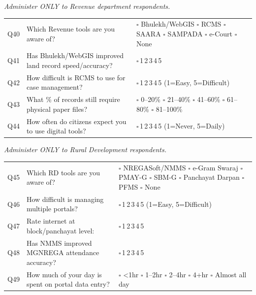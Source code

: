 \documentclass[10pt,a4paper]{article}
\newcommand{\likert}{{\Large$\square$}\,1\quad{\Large$\square$}\,2\quad{\Large$\square$}\,3\quad{\Large$\square$}\,4\quad{\Large$\square$}\,5}
\begin{document}
\small\textit{Administer ONLY to Revenue department respondents.}\vspace{3pt}

\noindent\begin{tabularx}{\textwidth}{@{}L{0.5cm} X L{5.5cm}@{}}
Q40 & Which Revenue tools are you aware of? & {\Large$\square$} Bhulekh/WebGIS {\Large$\square$} RCMS {\Large$\square$} SAARA {\Large$\square$} SAMPADA {\Large$\square$} e-Court {\Large$\square$} None \\[3pt]
Q41 & Has Bhulekh/WebGIS improved land record speed/accuracy? & \likert \\[3pt]
Q42 & How difficult is RCMS to use for case management? & \likert{} {\scriptsize(1=Easy, 5=Difficult)} \\[3pt]
Q43 & What \% of records still require physical paper files? & {\Large$\square$} 0--20\% {\Large$\square$} 21--40\% {\Large$\square$} 41--60\% {\Large$\square$} 61--80\% {\Large$\square$} 81--100\% \\[3pt]
Q44 & How often do citizens expect you to use digital tools? & \likert{} {\scriptsize(1=Never, 5=Daily)} \\
\end{tabularx}

\vspace{3pt}
\vspace{4pt}

\small\textit{Administer ONLY to Rural Development respondents.}\vspace{3pt}

\noindent\begin{tabularx}{\textwidth}{@{}L{0.5cm} X L{5.5cm}@{}}
Q45 & Which RD tools are you aware of? & {\Large$\square$} NREGASoft/NMMS {\Large$\square$} e-Gram Swaraj {\Large$\square$} PMAY-G {\Large$\square$} SBM-G {\Large$\square$} Panchayat Darpan {\Large$\square$} PFMS {\Large$\square$} None \\[3pt]
Q46 & How difficult is managing multiple portals? & \likert{} {\scriptsize(1=Easy, 5=Difficult)} \\[3pt]
Q47 & Rate internet at block/panchayat level: & \likert \\[3pt]
Q48 & Has NMMS improved MGNREGA attendance accuracy? & \likert \\[3pt]
Q49 & How much of your day is spent on portal data entry? & {\Large$\square$} <1hr {\Large$\square$} 1--2hr {\Large$\square$} 2--4hr {\Large$\square$} 4+hr {\Large$\square$} Almost all day \\
\end{tabularx}
\end{document}
